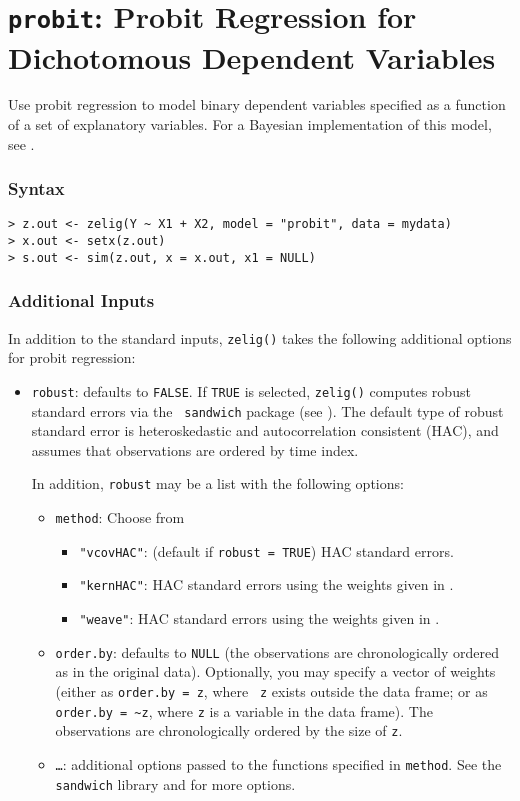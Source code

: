 \section{{\tt probit}: Probit Regression for Dichotomous Dependent Variables}\label{probit}

Use probit regression to model binary dependent variables
specified as a function of a set of explanatory variables.  For a
Bayesian implementation of this model, see .  

\subsubsection{Syntax}
\begin{verbatim}
> z.out <- zelig(Y ~ X1 + X2, model = "probit", data = mydata)
> x.out <- setx(z.out)
> s.out <- sim(z.out, x = x.out, x1 = NULL)
\end{verbatim}

\subsubsection{Additional Inputs} 

In addition to the standard inputs, {\tt zelig()} takes the following
additional options for probit regression:  
\begin{itemize}
\item {\tt robust}: defaults to {\tt FALSE}.  If {\tt TRUE} is
selected, {\tt zelig()} computes robust standard errors via the {\tt
sandwich} package (see \cite{Zeileis04}).  The default type of robust
standard error is heteroskedastic and autocorrelation consistent (HAC),
and assumes that observations are ordered by time index.

In addition, {\tt robust} may be a list with the following options:  
\begin{itemize}
\item {\tt method}:  Choose from 
\begin{itemize}
\item {\tt "vcovHAC"}: (default if {\tt robust = TRUE}) HAC standard
errors. 
\item {\tt "kernHAC"}: HAC standard errors using the
weights given in \cite{Andrews91}. 
\item {\tt "weave"}: HAC standard errors using the
weights given in \cite{LumHea99}.  
\end{itemize}  
\item {\tt order.by}: defaults to {\tt NULL} (the observations are
chronologically ordered as in the original data).  Optionally, you may
specify a vector of weights (either as {\tt order.by = z}, where {\tt
z} exists outside the data frame; or as {\tt order.by = \~{}z}, where
{\tt z} is a variable in the data frame).  The observations are
chronologically ordered by the size of {\tt z}.
\item {\tt \dots}:  additional options passed to the functions 
specified in {\tt method}.   See the {\tt sandwich} library and
\cite{Zeileis04} for more options.   
\end{itemize}
\end{itemize}

